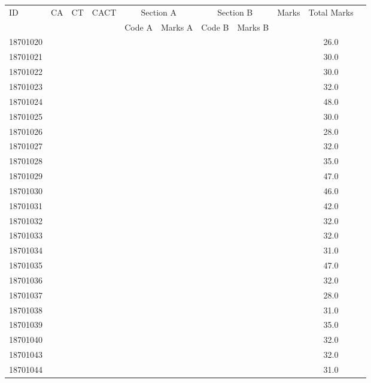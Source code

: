 \documentclass[12pt]{article}
\begin{document}
    \begin{center} 
	\renewcommand{\arraystretch}{1.08}
	\begin{small}
    \begin{tabular}{|l|c|c|c|c|c|c|c|c|c|c|} \hline
	\multirow{2}{*}{ID} & 	\multirow{2}{*}{CA}  & 	\multirow{2}{*}{CT}  & 	\multirow{2}{*}{CACT}  & \multicolumn{2 }{|c|}{Section A}& \multicolumn{2 }{c|}{Section B} & 	\multirow{2}{*}{Marks}  & 	\multirow{2}{*}{Total Marks}  \\ 
	&  &  &  & Code A & Marks A & Code B & Marks B&  &  \\ \hline
18701020 &  &  &  &  &  &  &  &  & 26.0\\ \hline 
18701021 &  &  &  &  &  &  &  &  & 30.0\\ \hline 
18701022 &  &  &  &  &  &  &  &  & 30.0\\ \hline 
18701023 &  &  &  &  &  &  &  &  & 32.0\\ \hline 
18701024 &  &  &  &  &  &  &  &  & 48.0\\ \hline 
18701025 &  &  &  &  &  &  &  &  & 30.0\\ \hline 
18701026 &  &  &  &  &  &  &  &  & 28.0\\ \hline 
18701027 &  &  &  &  &  &  &  &  & 32.0\\ \hline 
18701028 &  &  &  &  &  &  &  &  & 35.0\\ \hline 
18701029 &  &  &  &  &  &  &  &  & 47.0\\ \hline 
18701030 &  &  &  &  &  &  &  &  & 46.0\\ \hline 
18701031 &  &  &  &  &  &  &  &  & 42.0\\ \hline 
18701032 &  &  &  &  &  &  &  &  & 32.0\\ \hline 
18701033 &  &  &  &  &  &  &  &  & 32.0\\ \hline 
18701034 &  &  &  &  &  &  &  &  & 31.0\\ \hline 
18701035 &  &  &  &  &  &  &  &  & 47.0\\ \hline 
18701036 &  &  &  &  &  &  &  &  & 32.0\\ \hline 
18701037 &  &  &  &  &  &  &  &  & 28.0\\ \hline 
18701038 &  &  &  &  &  &  &  &  & 31.0\\ \hline 
18701039 &  &  &  &  &  &  &  &  & 35.0\\ \hline 
18701040 &  &  &  &  &  &  &  &  & 32.0\\ \hline 
18701043 &  &  &  &  &  &  &  &  & 32.0\\ \hline 
18701044 &  &  &  &  &  &  &  &  & 31.0\\ \hline 

\end{tabular}
\end{small}
\end{center}
\end{document}
